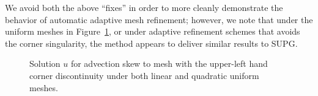We avoid both the above ``fixes'' in order to more cleanly demonstrate the behavior of automatic adaptive mesh refinement; however, we note that under the uniform meshes in Figure~\ref{fig:skewUnif}, or under adaptive refinement schemes that avoids the corner singularity, the method appears to deliver similar results to SUPG.  
\begin{figure}[!h]
\centering
{}
\caption{Solution $u$ for advection skew to mesh with the upper-left hand corner discontinuity under both linear and quadratic uniform meshes.}
\label{fig:skewUnif}
\end{figure}


